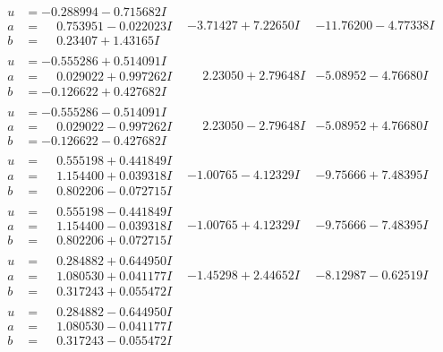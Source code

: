 \documentclass[1p]{elsarticle_modified}
\theoremstyle{definition}
\begin{document}
$$\begin{array}{c|c|c}
\begin{aligned}
u &= -0.288994 - 0.715682 I \\
a &= \phantom{-}0.753951 - 0.022023 I \\
b &= \phantom{-}0.23407 + 1.43165 I\end{aligned}
 & -3.71427 + 7.22650 I & -11.76200 - 4.77338 I \\ \hline\begin{aligned}
u &= -0.555286 + 0.514091 I \\
a &= \phantom{-}0.029022 + 0.997262 I \\
b &= -0.126622 + 0.427682 I\end{aligned}
 & \phantom{-}2.23050 + 2.79648 I & -5.08952 - 4.76680 I \\ \hline\begin{aligned}
u &= -0.555286 - 0.514091 I \\
a &= \phantom{-}0.029022 - 0.997262 I \\
b &= -0.126622 - 0.427682 I\end{aligned}
 & \phantom{-}2.23050 - 2.79648 I & -5.08952 + 4.76680 I \\ \hline\begin{aligned}
u &= \phantom{-}0.555198 + 0.441849 I \\
a &= \phantom{-}1.154400 + 0.039318 I \\
b &= \phantom{-}0.802206 - 0.072715 I\end{aligned}
 & -1.00765 - 4.12329 I & -9.75666 + 7.48395 I \\ \hline\begin{aligned}
u &= \phantom{-}0.555198 - 0.441849 I \\
a &= \phantom{-}1.154400 - 0.039318 I \\
b &= \phantom{-}0.802206 + 0.072715 I\end{aligned}
 & -1.00765 + 4.12329 I & -9.75666 - 7.48395 I \\ \hline\begin{aligned}
u &= \phantom{-}0.284882 + 0.644950 I \\
a &= \phantom{-}1.080530 + 0.041177 I \\
b &= \phantom{-}0.317243 + 0.055472 I\end{aligned}
 & -1.45298 + 2.44652 I & -8.12987 - 0.62519 I \\ \hline\begin{aligned}
u &= \phantom{-}0.284882 - 0.644950 I \\
a &= \phantom{-}1.080530 - 0.041177 I \\
b &= \phantom{-}0.317243 - 0.055472 I\end{aligned}

\end{array}$$
\end{document}
